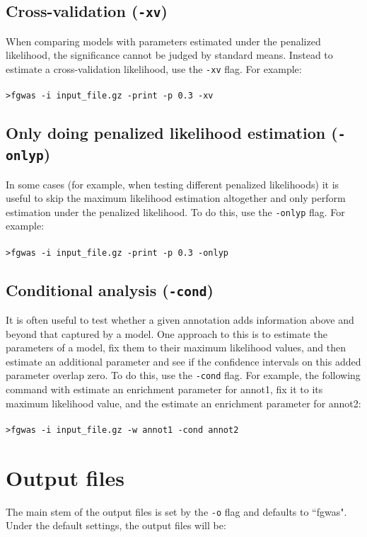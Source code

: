 \documentclass[11pt,titlepage]{article}
\begin{document}
\subsection{Cross-validation (\texttt{-xv})}
When comparing models with parameters estimated under the penalized likelihood, the significance cannot be judged by standard means. Instead to estimate a cross-validation likelihood, use the \texttt{-xv} flag. For example:
\\
\\
\texttt{>fgwas -i input\_file.gz -print -p 0.3 -xv}
\subsection{Only doing penalized likelihood estimation (\texttt{-onlyp})}
In some cases (for example, when testing different penalized likelihoods) it is useful to skip the maximum likelihood estimation altogether and only perform estimation under the penalized likelihood. To do this, use the \texttt{-onlyp} flag. For example:
\\
\\
\texttt{>fgwas -i input\_file.gz -print -p 0.3 -onlyp}

\subsection{Conditional analysis (\texttt{-cond})}
It is often useful to test whether a given annotation adds information above and beyond that captured by a model. One approach to this is to estimate the parameters of a model, fix them to their maximum likelihood values, and then estimate an additional parameter and see if the confidence intervals on this added parameter overlap zero. To do this, use the \texttt{-cond} flag. For example, the following command with estimate an enrichment parameter for annot1, fix it to its maximum likelihood value, and the estimate an enrichment parameter for annot2:
\\
\\
\texttt{>fgwas -i input\_file.gz -w annot1 -cond annot2}



\section{Output files}
The main stem of the output files is set by the \texttt{-o} flag and defaults to ``fgwas". Under the default settings, the output files will be:
\end{document}
